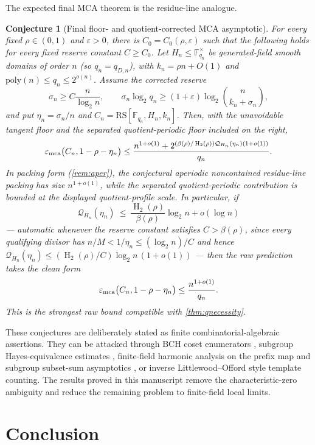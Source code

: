 \documentclass[11pt]{article}
\newtheorem{conjecture}[conjecture]{Conjecture}
\theoremstyle{definition}
\newcommand{\F}{\mathbb F}
\newcommand{\eps}{\varepsilon}
\newcommand{\HH}{\operatorname{H}_2}
\newcommand{\RS}{\mathrm{RS}}
\newcommand{\emca}{\eps_{\rm mca}}
\begin{document}
The expected final MCA theorem is the residue-line analogue.
\begin{conjecture}[Final floor- and quotient-corrected MCA asymptotic]\label{conj:final-mca}
For every fixed $\rho\in(0,1)$ and $\eps>0$, there is $C_0=C_0(\rho,\eps)$ such that the following holds for every fixed reserve constant $C\ge C_0$.  Let $H_n\le\F_{q_n}^\times$ be generated-field smooth domains of order $n$ (so $q_n=q_{D,n}$), with $k_n=\rho n+O(1)$ and $\mathrm{poly}(n)\le q_n\le2^{o(n)}$.  Assume the corrected reserve
\[
        \sigma_n\ge C\frac n{\log_2n},
        \qquad
        \sigma_n\log_2q_n\ge(1+\eps)\log_2\binom n{k_n+\sigma_n},
\]
and put $\eta_n=\sigma_n/n$ and $C_n=\RS[\F_{q_n},H_n,k_n]$.  Then, with the unavoidable tangent floor and the separated quotient-periodic floor included on the right,
\[
        \emca\big(C_n,1-\rho-\eta_n\big)
        \le
        \frac{n^{1+o(1)}+2^{(\beta(\rho)/\HH(\rho))\mathcal Q_{H_n}(\eta_n)(1+o(1))}}{q_n}.
\]
In packing form (\cref{rem:aper}), the conjectural aperiodic noncontained residue-line packing has size $n^{1+o(1)}$, while the separated quotient-periodic contribution is bounded at the displayed quotient-profile scale.  In particular, if
\[
        \mathcal Q_{H_n}(\eta_n)\ \le\ \frac{\HH(\rho)}{\beta(\rho)}\log_2n+o(\log n)
\]
--- automatic whenever the reserve constant satisfies $C>\beta(\rho)$, since every qualifying divisor has $n/M<1/\eta_n\le(\log_2n)/C$ and hence $\mathcal Q_{H_n}(\eta_n)\le(\HH(\rho)/C)\log_2n\,(1+o(1))$ --- then the raw prediction takes the clean form
\[
        \emca\big(C_n,1-\rho-\eta_n\big)\le\frac{n^{1+o(1)}}{q_n}.
\]
This is the strongest raw bound compatible with \cref{thm:qnecessity}.
\end{conjecture}

These conjectures are deliberately stated as finite combinatorial-algebraic assertions.  They can be attacked through BCH coset enumerators \cite{DMP21}, subgroup Hayes-equivalence estimates \cite{Gao21,Gao22}, finite-field harmonic analysis on the prefix map and subgroup subset-sum asymptotics \cite{LiWan08,ZhuWan10}, or inverse Littlewood--Offord style template counting.  The results proved in this manuscript remove the characteristic-zero ambiguity and reduce the remaining problem to finite-field local limits.

\section{Conclusion}\label{sec:final-conclusion}
\end{document}
